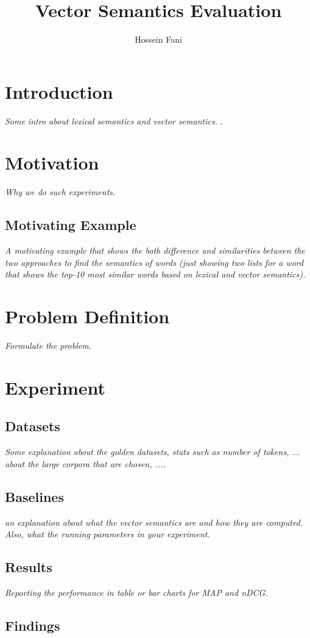 \documentclass[sigconf]{acmart}
\begin{document}
\title{Vector Semantics Evaluation}
\author{Hossein Fani}

\maketitle

\section{Introduction}
\textit{Some intro about lexical semantics and vector semantics. }.
\section{Motivation}
\textit{Why we do such experiments.} 
\subsection{Motivating Example}
\textit{A motivating example that shows the both difference and similarities between the two approaches to find the semantics of words (just showing two lists for a word that shows the top-10 most similar words based on lexical and vector semantics).}
\section{Problem Definition}
\textit{Formulate the problem.} 
\section{Experiment}
\subsection{Datasets}
\textit{Some explanation about the golden datasets, stats such as number of tokens, ... about the large corpora that are chosen, ....}
\subsection{Baselines}
\textit{an explanation about what the vector semantics are and how they are computed. Also, what the running parameters in your experiment. }
\subsection{Results}
\textit{Reporting the performance in table or bar charts for MAP and nDCG.}
\subsection{Findings}

 
\end{document}
